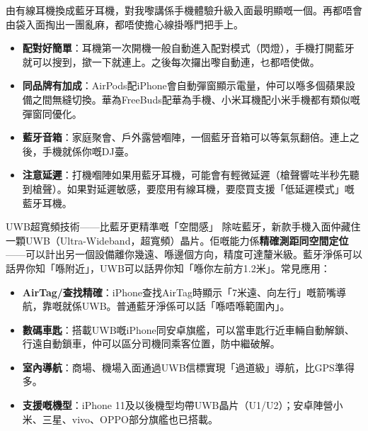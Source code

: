 
由有線耳機換成藍牙耳機，對我嚟講係手機體驗升級入面最明顯嘅一個。再都唔會由袋入面掏出一團亂麻，都唔使擔心線掛喺門把手上。

\begin{itemize}
  \item \textbf{配對好簡單}：耳機第一次開機一般自動進入配對模式（閃燈），手機打開藍牙就可以搜到，撳一下就連上。之後每次攞出嚟自動連，乜都唔使做。
  \item \textbf{同品牌有加成}：AirPods配iPhone會自動彈窗顯示電量，仲可以喺多個蘋果設備之間無縫切換。華為FreeBuds配華為手機、小米耳機配小米手機都有類似嘅彈窗同優化。
  \item \textbf{藍牙音箱}：家庭聚會、戶外露營嗰陣，一個藍牙音箱可以等氣氛翻倍。連上之後，手機就係你嘅DJ臺。
  \item \textbf{注意延遲}：打機嗰陣如果用藍牙耳機，可能會有輕微延遲（槍聲響咗半秒先聽到槍聲）。如果對延遲敏感，要麼用有線耳機，要麼買支援「低延遲模式」嘅藍牙耳機。
\end{itemize}

\begin{tcbinfo}{UWB超寬頻技術——比藍牙更精準嘅「空間感」}
除咗藍牙，新款手機入面仲藏住一顆UWB（Ultra-Wideband，超寬頻）晶片。佢嘅能力係\textbf{精確測距同空間定位}——可以計出另一個設備離你幾遠、喺邊個方向，精度可達釐米級。藍牙淨係可以話畀你知「喺附近」，UWB可以話畀你知「喺你左前方1.2米」。常見應用：

\begin{itemize}
  \item \textbf{AirTag/查找精確}：iPhone查找AirTag時顯示「7米遠、向左行」嘅箭嘴導航，靠嘅就係UWB。普通藍牙淨係可以話「喺唔喺範圍內」。
  \item \textbf{數碼車匙}：搭載UWB嘅iPhone同安卓旗艦，可以當車匙行近車輛自動解鎖、行遠自動鎖車，仲可以區分司機同乘客位置，防中繼破解。
  \item \textbf{室內導航}：商場、機場入面通過UWB信標實現「過道級」導航，比GPS準得多。
  \item \textbf{支援嘅機型}：iPhone 11及以後機型均帶UWB晶片（U1/U2）；安卓陣營小米、三星、vivo、OPPO部分旗艦也已搭載。
\end{itemize}

\end{tcbinfo}

